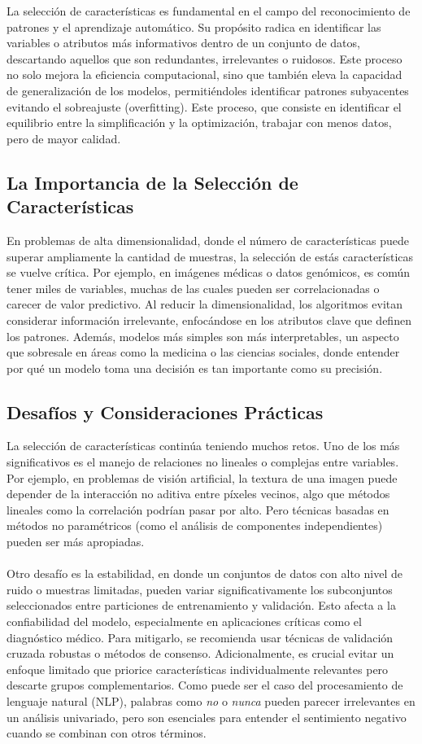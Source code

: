 La selección de características es fundamental en el campo del reconocimiento de
patrones y el aprendizaje automático. Su propósito radica en identificar las variables
o atributos más informativos dentro de un conjunto de datos, descartando aquellos que
son redundantes, irrelevantes o ruidosos. Este proceso no solo mejora la eficiencia
computacional, sino que también eleva la capacidad de generalización de los modelos,
permitiéndoles identificar patrones subyacentes evitando  el sobreajuste (overfitting).
Este proceso, que consiste en identificar el equilibrio entre la simplificación y la
optimización, trabajar con menos datos, pero de mayor calidad.

\subsection{La Importancia de la Selección de Características}
En problemas de alta dimensionalidad, donde el número de características puede superar
ampliamente la cantidad de muestras, la selección de estás características se vuelve
crítica. Por ejemplo, en imágenes médicas o datos genómicos, es común tener miles de
variables, muchas de las cuales pueden ser correlacionadas o carecer de valor predictivo.
Al reducir la dimensionalidad, los algoritmos evitan considerar información irrelevante,
enfocándose en los atributos clave que definen los patrones. Además, modelos más simples
son más interpretables, un aspecto que sobresale en áreas como la medicina o las ciencias
sociales, donde entender por qué un modelo toma una decisión es tan importante como su precisión.

\subsection{Desafíos y Consideraciones Prácticas}
La selección de características continúa teniendo muchos retos. Uno de los más significativos
es el manejo de relaciones no lineales o complejas entre variables. Por ejemplo, en problemas
de visión artificial, la textura de una imagen puede depender de la interacción no aditiva entre
píxeles vecinos, algo que métodos lineales como la correlación podrían pasar por alto. Pero
técnicas basadas en métodos no paramétricos (como el análisis de componentes independientes)
pueden ser más apropiadas.
\\\\
Otro desafío es la estabilidad, en donde un conjuntos de datos con alto nivel de ruido o muestras
limitadas, pueden variar significativamente los subconjuntos seleccionados entre particiones de
entrenamiento y validación. Esto afecta a la confiabilidad del modelo, especialmente en aplicaciones
críticas como el diagnóstico médico. Para mitigarlo, se recomienda usar técnicas de validación cruzada
robustas o métodos de consenso. Adicionalmente, es crucial evitar un enfoque limitado que priorice
características individualmente relevantes pero descarte grupos complementarios. Como puede ser el
caso del procesamiento de lenguaje natural (NLP), palabras como \textit{no} o \textit{nunca} pueden
parecer irrelevantes en un análisis univariado, pero son esenciales para entender el sentimiento
negativo cuando se combinan con otros términos.
\\\\